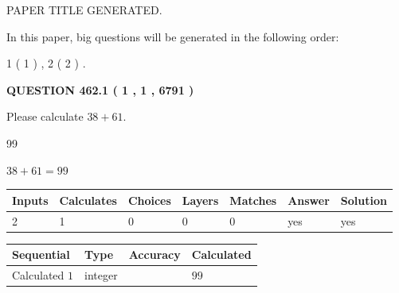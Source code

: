 \documentclass[12pt]{article}
\begin{document}
 
 
 
   
   
 PAPER TITLE GENERATED.
   
   
   
\vspace{0.2in}
   
In this paper, big questions will be generated in the following order: 
   
   
   1 ( 1 )
 ,
   2 ( 2 )
 .
  
\vspace{0.2in}
  
{\textbf{\Large{QUESTION
462.1 
 ( 1 , 1 , 6791 )
}}}
  
  
 
Please calculate $ %
38 +  %
61 $.
 
 
 
\noindent{}
 
 

99
 
 
\noindent{}
 
 

 
 
 
\noindent{}
 
 

$ %
38 +  %
61=   %
99$
 
 
\noindent{}
 
 

 
   
   
   
   
\noindent\begin{tabular}{|l|l|l|l|l|l|l|}
 \hline
Inputs & Calculates & Choices & Layers & Matches & Answer & Solution \\ \hline
 2  & 
 1  & 
 0
  & 
 0  & 
 0  & 
  yes & 
  yes 
  \\ \hline
 \end{tabular}
   
   
   
   
\noindent{}
   
   
  
  
\noindent\begin{tabular}{|l|l|l|l|}
\hline
 Sequential & Type & Accuracy & Calculated \\ 
\hline
 
 
  Calculated $  1 $ & integer &  & 
  $ 99 $ 
 \\  \hline  
 \end{tabular}
   
\end{document}
